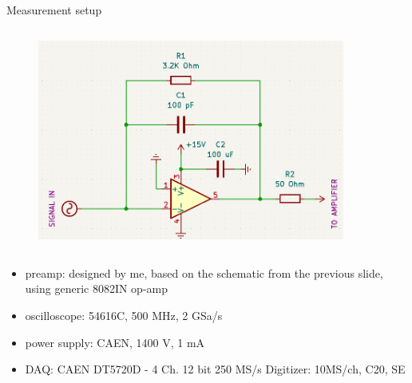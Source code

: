 \begin{columnframe}{Measurement setup}
    \begin{column}{0.5\textwidth}
        \begin{figure}
            \centering
            \includegraphics[width=0.9\textwidth]{images/schematic_csp.png}
        \end{figure}
    \end{column}
    \begin{column}{0.5\textwidth}
        \begin{itemize}
            \item preamp: designed by me, based on the schematic from the previous slide, using generic 8082IN op-amp
            \item oscilloscope: 54616C, 500 MHz, 2 GSa/s
            \item power supply: CAEN,  1400 V, 1 mA
            \item DAQ: CAEN DT5720D - 4 Ch. 12 bit 250 MS/s Digitizer: 10MS/ch, C20, SE
        \end{itemize}
    \end{column}
\end{columnframe}

